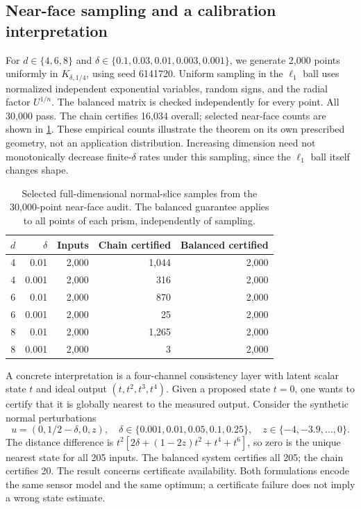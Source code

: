 \documentclass[11pt]{article}
\theoremstyle{definition}\newtheorem{definition}[theorem]{Definition}
\theoremstyle{remark}\newtheorem{remark}[theorem]{Remark}
\begin{document}
\subsection{Near-face sampling and a calibration interpretation}
For $d\in\{4,6,8\}$ and $\delta\in\{0.1,0.03,0.01,0.003,0.001\}$, we generate 2,000 points uniformly in $K_{\delta,1/4}$, using seed 6141720. Uniform sampling in the $\ell_1$ ball uses normalized independent exponential variables, random signs, and the radial factor $U^{1/n}$. The balanced matrix is checked independently for every point. All 30,000 pass. The chain certifies 16,034 overall; selected near-face counts are shown in \cref{tab:near}. These empirical counts illustrate the theorem on its own prescribed geometry, not an application distribution. Increasing dimension need not monotonically decrease finite-$\delta$ rates under this sampling, since the $\ell_1$ ball itself changes shape.

\begin{table}[t]
\centering
\begin{tabular}{rrrrr}
\toprule
$d$ & $\delta$ & Inputs & Chain certified & Balanced certified\\\midrule
4&0.01&2,000&1,044&2,000\\
4&0.001&2,000&316&2,000\\
6&0.01&2,000&870&2,000\\
6&0.001&2,000&25&2,000\\
8&0.01&2,000&1,265&2,000\\
8&0.001&2,000&3&2,000\\\bottomrule
\end{tabular}
\caption{Selected full-dimensional normal-slice samples from the 30,000-point near-face audit. The balanced guarantee applies to all points of each prism, independently of sampling.}\label{tab:near}
\end{table}

A concrete interpretation is a four-channel consistency layer with latent scalar state $t$ and ideal output $(t,t^2,t^3,t^4)$. Given a proposed state $t=0$, one wants to certify that it is globally nearest to the measured output. Consider the synthetic normal perturbations
\[
 u=(0,1/2-\delta,0,z),\quad
 \delta\in\{0.001,0.01,0.05,0.1,0.25\},\quad
 z\in\{-4,-3.9,\ldots,0\}.
\]
The distance difference is $t^2[2\delta+(1-2z)t^2+t^4+t^6]$, so zero is the unique nearest state for all 205 inputs. The balanced system certifies all 205; the chain certifies 20. The result concerns certificate availability. Both formulations encode the same sensor model and the same optimum; a certificate failure does not imply a wrong state estimate.
\end{document}
